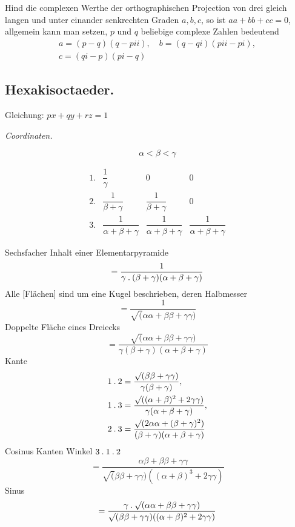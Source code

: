 Hind die complexen Werthe der orthographischen Projection von drei gleich langen und unter einander senkrechten Graden $a,b,c$, so ist $aa+bb+cc=0$, allgemein kann man setzen, $p$ und $q$ beliebige complexe Zahlen bedeutend
\[
\begin{gathered}
a=(p-q)(q-pii),\quad b=(q-qi)(pii-pi),\\c=(qi-p)(pi-q)
\end{gathered}
\]

%
\subsection*{Hexakisoctaeder.}
\begin{center}
\resizebox{!}{14mm}{}\qquad Gleichung: $px+qy+rz=1$
\end{center}

\begin{center}\emph{Coordinaten.}\end{center}
\begin{center}
\begin{minipage}{.28\textwidth}\centering
\resizebox{\linewidth}{!}{}
\[\alpha<\beta<\gamma\]
\end{minipage}\hfill
\begin{minipage}{.68\textwidth}
\[
\begin{array}{rccc}
1.&\dfrac1\gamma&0&0\\[1ex]
2.&\dfrac1{\beta+\gamma}&\dfrac1{\beta+\gamma}&0\\[1ex]
3.&\dfrac1{\alpha+\beta+\gamma}&\dfrac1{\alpha+\beta+\gamma}&\dfrac1{\alpha+\beta+\gamma}
\end{array}
\]
\end{minipage}
\end{center}

Sechsfacher Inhalt einer Elementarpyramide
\[
=\frac1{\gamma\mathbin{.}(\beta+\gamma)(\alpha+\beta+\gamma)}
\]
Alle [Flächen] sind um eine Kugel beschrieben, deren Halbmesser
\[
=\frac1{\surd(\alpha\alpha+\beta\beta+\gamma\gamma)}
\]
Doppelte Fläche eines Dreiecks
\[
=\frac{\surd(\alpha\alpha+\beta\beta+\gamma\gamma)}{\gamma(\beta+\gamma)(\alpha+\beta+\gamma)}
\]
Kante
\[
\begin{aligned}
1\mathbin{.}2&=\frac{\surd(\beta\beta+\gamma\gamma)}{\gamma(\beta+\gamma)},\\
1\mathbin{.}3&=\frac{\surd((\alpha+\beta)^2+2\gamma\gamma)}{\gamma(\alpha+\beta+\gamma)},\\
2\mathbin{.}3&=\frac{\surd(2\alpha\alpha+(\beta+\gamma)^2)}{(\beta+\gamma)(\alpha+\beta+\gamma)}
\end{aligned}
\]
Cosinus Kanten Winkel $3\mathbin{.}1\mathbin{.}2$
\[
=\frac{\alpha\beta+\beta\beta+\gamma\gamma}{\surd(\beta\beta+\gamma\gamma)((\alpha+\beta)^3+2\gamma\gamma)}
\]
Sinus
\[
=\frac{\gamma\mathbin{.}\surd(\alpha\alpha+\beta\beta+\gamma\gamma)}{\surd(\beta\beta+\gamma\gamma)((\alpha+\beta)^2+2\gamma\gamma)}
\]


